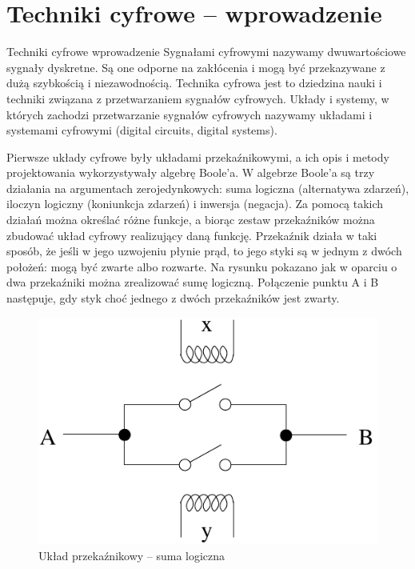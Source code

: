\documentclass[a4paper,11pt]{article}
\begin{document}
 
\section*{Techniki cyfrowe -- wprowadzenie}
 


Techniki cyfrowe wprowadzenie Sygnałami cyfrowymi nazywamy dwuwartościowe sygnały dyskretne. Są one odporne na zakłócenia i mogą być przekazywane z dużą szybkością i niezawodnością. Technika cyfrowa jest to dziedzina nauki i techniki związana z przetwarzaniem sygnałów cyfrowych. Układy i systemy, w których zachodzi przetwarzanie sygnałów cyfrowych nazywamy układami i systemami cyfrowymi (digital circuits, digital systems).

Pierwsze układy cyfrowe były układami przekaźnikowymi, a ich opis i metody projektowania wykorzystywały algebrę Boole'a. W algebrze Boole'a są trzy działania na argumentach zerojedynkowych: suma logiczna (alternatywa zdarzeń), iloczyn logiczny (koniunkcja zdarzeń) i inwersja (negacja). Za pomocą takich działań można określać różne funkcje, a biorąc zestaw przekaźników można zbudować układ cyfrowy realizujący daną funkcję. Przekaźnik działa w taki sposób, że jeśli w jego uzwojeniu płynie prąd, to jego styki są w jednym z dwóch położeń: mogą być zwarte albo rozwarte. Na rysunku pokazano jak w oparciu o dwa przekaźniki można zrealizować sumę logiczną. Połączenie punktu A i B następuje, gdy styk choć jednego z dwóch przekaźników jest zwarty.

\begin{figure}[!htb]
\centerline{\includegraphics[scale=0.6]{uklad-przekaznikowy.pdf}}
\caption{Układ przekaźnikowy -- suma logiczna}
\label{fig:ukladPrzekaznikowy}
\end{figure}
 
\end{document}
